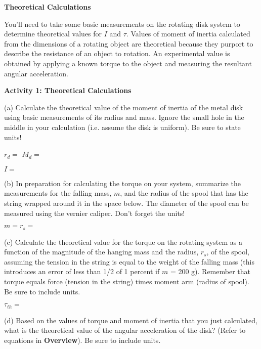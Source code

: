 \textbf{Theoretical Calculations} 

You'll need to take some basic measurements on the rotating disk system
to determine theoretical values for $I$ and \( \tau  \). Values of moment of
inertia calculated from the dimensions of a rotating object are theoretical
because they purport to describe the resistance of an object to rotation. An
experimental value is obtained by applying a known torque to the object and
measuring the resultant angular acceleration.

\newpage

\textbf{Activity 1: Theoretical Calculations }

(a) Calculate the theoretical value of the moment of inertia of the metal disk
using basic measurements of its radius and mass. Ignore the small hole in the
middle in your calculation (i.e. assume the disk is uniform). Be sure to state 
units!
\vspace{5mm}

\( r_{d} =\) \hfill{}\( M_{d}= \) \hfill{}
\vspace{5mm}

\( I = \) 
\answerspace{5mm}

(b) In preparation for calculating the torque on your system, summarize the
measurements for the falling mass, $m$, and the radius of the spool that has the string wrapped around it in the space below. The diameter of the spool can be measured using the vernier caliper. Don't forget the units!
\vspace{5mm}

$m = $\hfill{}\(r_{s}= \)\hfill{} 
\answerspace{5mm}

(c) Calculate the theoretical value for the torque on the rotating system as
a function of the magnitude of the hanging mass and the radius, \( r_{s} \),
of the spool, assuming the tension in the string is equal to the weight of the 
falling mass (this introduces an error of less than 1/2 of 1 percent if 
$m$ = 200 g). Remember that torque equals force (tension in the string) times 
moment arm (radius of spool). Be sure to include units.
\vspace{5mm}

\( \tau _{th}= \)
\answerspace{5mm}

(d) Based on the values of torque and moment of inertia that you just 
calculated, what is the theoretical value of the angular acceleration of the 
disk? (Refer to equations in \textbf{Overview}). Be sure to include units.
\vspace{5mm}

